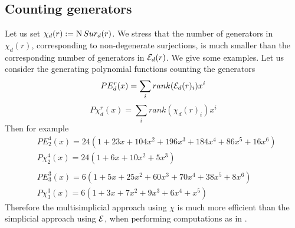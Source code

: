 \subsection{Counting generators}

Let us set $\chi_d(r):=\operatorname{N}Sur_{d}(r)$. We stress that the number of generators in $\chi_d(r)$, corresponding to non-degenerate surjections, is much smaller than the corresponding number of generators in $\mathcal{E}_d(r)$.
We give some examples.
Let us consider the generating polynomial functions counting the generators
$$PE_d^r(x) = \sum_i rank(\mathcal{E}_d(r)_i) x^i $$ $$P\chi_d^r(x)=
\sum_i rank(\chi_d(r)_i) x^i$$
Then for example
\begin{align*}
	& PE_2^4(x)=24(1+23x+104x^2+196x^3+184x^4+86x^5+16x^6)\\
	& P\chi_2^4(x)=24(1+6x+10x^2+5x^3) \\
	& \\
	& PE_3^3(x) = 6(1+5x+25x^2+60x^3+70x^4+38x^5+8x^6 ) \\
	&  P\chi_3^3(x)= 6(1+3x+7x^2+9x^3+6x^4+x^5)
\end{align*}
Therefore the multisimplicial approach using $\chi$ is much more efficient than the simplicial
approach using $\mathcal{E}$, when performing computations as in \cite{salvatore2020planarnonformality}.